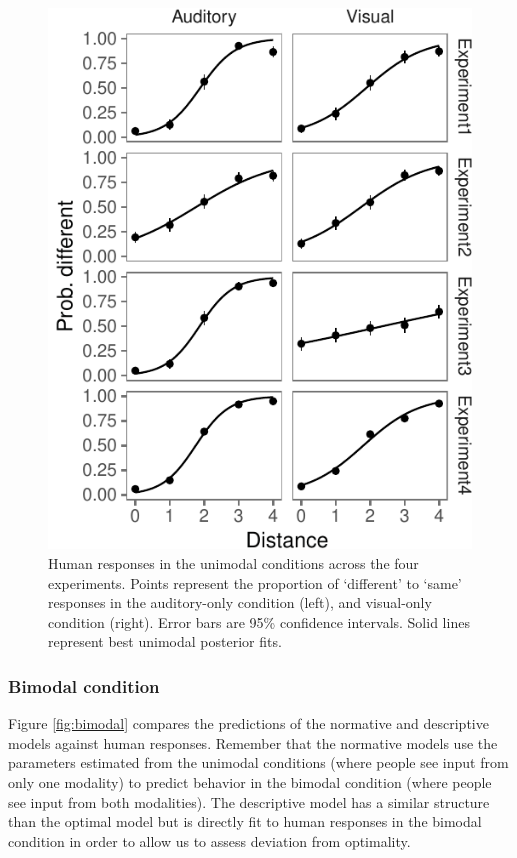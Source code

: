 \documentclass[english,,man,floatsintext]{apa6}
\theoremstyle{definition}
\theoremstyle{definition}
\theoremstyle{definition}
\theoremstyle{remark}
\begin{document}
\begin{figure}[!h]
\includegraphics[width=\textwidth]{ms_r2_files/figure-latex/unimodal-1} \caption{Human responses in the unimodal conditions across the four experiments. Points represent the proportion of `different' to `same' responses in the auditory-only condition (left), and visual-only condition (right). Error bars are 95\% confidence intervals. Solid lines represent best unimodal posterior fits.}\label{fig:unimodal}
\end{figure}

\subsubsection{Bimodal condition}\label{bimodal-condition-1}

Figure \ref{fig:bimodal} compares the predictions of the normative and
descriptive models against human responses. Remember that the normative
models use the parameters estimated from the unimodal conditions (where
people see input from only one modality) to predict behavior in the
bimodal condition (where people see input from both modalities). The
descriptive model has a similar structure than the optimal model but is
directly fit to human responses in the bimodal condition in order to
allow us to assess deviation from optimality.
\end{document}
